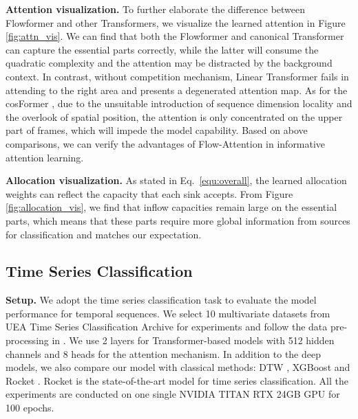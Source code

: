 \documentclass[nohyperref]{article}
\theoremstyle{plain}
\theoremstyle{definition}
\theoremstyle{remark}
\begin{document}
\textbf{Attention visualization.} To further elaborate the difference between Flowformer and other Transformers, we visualize the learned attention in Figure \ref{fig:attn_vis}. We can find that both the Flowformer and canonical Transformer \cite{NIPS2017_3f5ee243} can capture the essential parts correctly, while the latter will consume the quadratic complexity and the attention may be distracted by the background context. In contrast, without competition mechanism, Linear Transformer \cite{Katharopoulos2020TransformersAR} fails in attending to the right area and presents a degenerated attention map. As for the cosFormer \cite{anonymous2022cosformer}, due to the unsuitable introduction of sequence dimension locality and the overlook of spatial position, the attention is only concentrated on the upper part of frames, which will impede the model capability. Based on above comparisons, we can verify the advantages of Flow-Attention in informative attention learning.

\textbf{Allocation visualization.} As stated in Eq.~\eqref{equ:overall}, the learned allocation weights can reflect the capacity that each sink accepts. From Figure \ref{fig:allocation_vis}, we find that inflow capacities remain large on the essential parts, which means that these parts require more global information from sources for classification and matches our expectation.


\subsection{Time Series Classification}

\textbf{Setup.} We adopt the time series classification task to evaluate the model performance for temporal sequences. We select 10 multivariate datasets from UEA Time Series Classification Archive \cite{Bagnall2018TheUM} for experiments and follow the data pre-processing in \cite{Zerveas2021ATF}. We use 2 layers for Transformer-based models with 512 hidden channels and 8 heads for the attention mechanism. In addition to the deep models, we also compare our model with classical methods: DTW \cite{Berndt1994UsingDT}, XGBoost \cite{Chen2016XGBoostAS} and Rocket \cite{Dempster2020ROCKETEF}. Rocket is the state-of-the-art model for time series classification. All the experiments are conducted on one single NVIDIA TITAN RTX 24GB GPU for 100 epochs.
\end{document}
